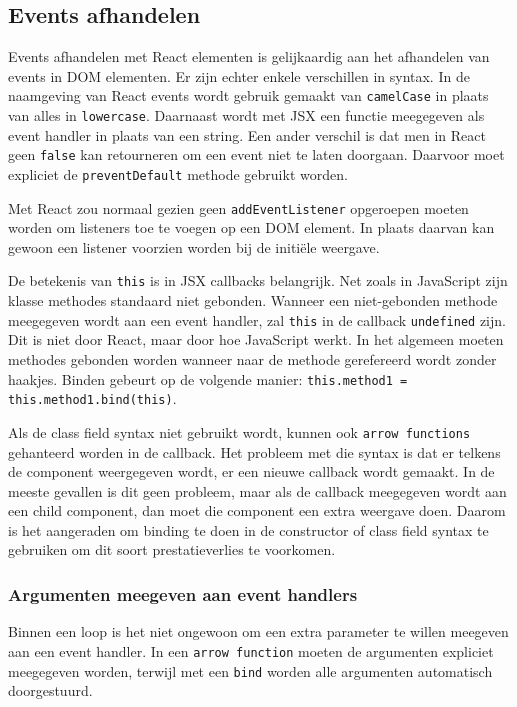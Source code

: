 \subsection{Events afhandelen}

Events afhandelen met React elementen is gelijkaardig aan het afhandelen van events in DOM elementen. Er zijn echter enkele verschillen in syntax. In de naamgeving van React events wordt gebruik gemaakt van \texttt{camelCase} in plaats van alles in \texttt{lowercase}. Daarnaast wordt met JSX een functie meegegeven als event handler in plaats van een string. Een ander verschil is dat men in React geen \texttt{false} kan retourneren om een event niet te laten doorgaan. Daarvoor moet expliciet de \texttt{preventDefault} methode gebruikt worden.  \autocite{React2019f}

Met React zou normaal gezien geen \texttt{addEventListener} opgeroepen moeten worden om listeners toe te voegen op een DOM element. In plaats daarvan kan gewoon een listener voorzien worden bij de initiële weergave.  \autocite{React2019f}

De betekenis van \texttt{this} is in JSX callbacks belangrijk. Net zoals in JavaScript zijn klasse methodes standaard niet gebonden. Wanneer een niet-gebonden methode meegegeven wordt aan een event handler, zal \texttt{this} in de callback \texttt{undefined} zijn. Dit is niet door React, maar door hoe JavaScript werkt. In het algemeen moeten methodes gebonden worden wanneer naar de methode gerefereerd wordt zonder haakjes. Binden gebeurt op de volgende manier: \texttt{this.method1 = this.method1.bind(this)}.  \autocite{React2019f}

Als de class field syntax niet gebruikt wordt, kunnen ook \texttt{arrow functions} gehanteerd worden in de callback. Het probleem met die syntax is dat er telkens de component weergegeven wordt, er een nieuwe callback wordt gemaakt. In de meeste gevallen is dit geen probleem, maar als de callback meegegeven wordt aan een child component, dan moet die component een extra weergave doen. Daarom is het aangeraden om binding te doen in de constructor of class field syntax te gebruiken om dit soort prestatieverlies te voorkomen. \autocite{React2019f}

\subsubsection{Argumenten meegeven aan event handlers}

Binnen een loop is het niet ongewoon om een extra parameter te willen meegeven aan een event handler. In een \texttt{arrow function} moeten de argumenten expliciet meegegeven worden, terwijl met een \texttt{bind} worden alle argumenten automatisch doorgestuurd. \autocite{React2019f}

